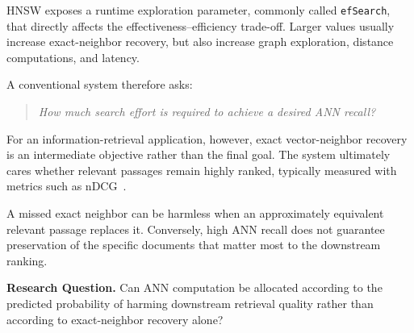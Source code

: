 \documentclass[10pt,twocolumn]{article}
\newcommand{\ef}{\texttt{efSearch}}
\begin{document}
HNSW exposes a runtime exploration parameter, commonly called \ef{}, that directly affects the effectiveness--efficiency trade-off. Larger values usually increase exact-neighbor recovery, but also increase graph exploration, distance computations, and latency.

A conventional system therefore asks:
\begin{quote}
\emph{How much search effort is required to achieve a desired ANN recall?}
\end{quote}

For an information-retrieval application, however, exact vector-neighbor recovery is an intermediate objective rather than the final goal. The system ultimately cares whether relevant passages remain highly ranked, typically measured with metrics such as nDCG~\citep{jarvelin2002cg}.

A missed exact neighbor can be harmless when an approximately equivalent relevant passage replaces it. Conversely, high ANN recall does not guarantee preservation of the specific documents that matter most to the downstream ranking.

\begin{tcolorbox}[colback=GoldLight,colframe=Gold,boxrule=0.8pt,arc=3pt,left=5pt,right=5pt,top=4pt,bottom=4pt]
\small
\textbf{Research Question.}
Can ANN computation be allocated according to the predicted probability of harming downstream retrieval quality rather than according to exact-neighbor recovery alone?
\end{tcolorbox}
\end{document}
